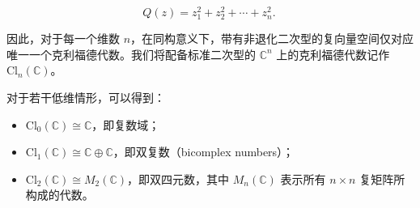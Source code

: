 $$
Q(z) = z_1^2 + z_2^2 + \cdots + z_n^2.~
$$

因此，对于每一个维数 $n$，在同构意义下，带有非退化二次型的复向量空间仅对应唯一一个克利福德代数。我们将配备标准二次型的 $\mathbb{C}^n$ 上的克利福德代数记作 $\mathrm{Cl}_n(\mathbb{C})$。

对于若干低维情形，可以得到：

\begin{itemize}
\item $\mathrm{Cl}_0(\mathbb{C}) \cong \mathbb{C}$，即复数域；

\item $\mathrm{Cl}_1(\mathbb{C}) \cong \mathbb{C} \oplus \mathbb{C}$，即双复数（bicomplex numbers）；
\item $\mathrm{Cl}_2(\mathbb{C}) \cong M_2(\mathbb{C})$，即双四元数，其中 $M_n(\mathbb{C})$ 表示所有 $n \times n$ 复矩阵所构成的代数。

\end{itemize}
